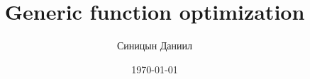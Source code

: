 \documentclass[aspectratio=169]{beamer}
\title{Generic function optimization}
\author{Синицын Даниил}
\date{\today}
\begin{document}
\lstset{language=C++}
\begin{frame}
\titlepage
\end{frame}

\begin{frame}
  \tableofcontents
\end{frame}




\end{document}
